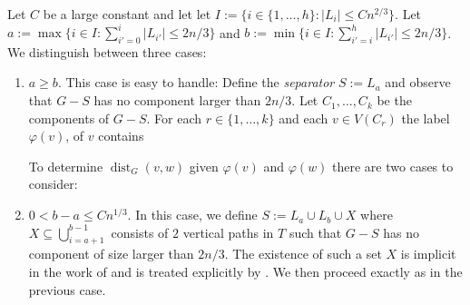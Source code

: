 \documentclass{patmorin}
\DeclareMathOperator{\dist}{dist}
\begin{document}
Let $C$ be a large constant and let let $I:=\{i\in\{1,\ldots,h\}: |L_i|\le Cn^{2/3}\}$.
Let $a:=\max\{i\in I: \sum_{i'=0}^i |L_{i'}| \le 2n/3\}$ and $b:=\min\{i\in I: \sum_{i'=i}^h |L_{i'}| \le 2n/3\}$.  We distinguish between three cases:
\begin{enumerate}
    \item $a \ge b$.  This case is easy to handle: Define the \emph{separator} $S:=L_{a}$ and observe that $G-S$ has no component larger than $2n/3$. Let $C_1,\ldots,C_k$ be the components of $G-S$.  For each $r\in\{1,\ldots,k\}$ and each $v\in V(C_r)$ the label $\varphi(v)$, of $v$ contains
    To determine $\dist_G(v,w)$ given $\varphi(v)$ and $\varphi(w)$ there are two cases to consider:

    \item $0 < b-a \le Cn^{1/3}$.  In this case, we define $S:=L_a\cup L_b\cup X$ where $X\subseteq \bigcup_{i=a+1}^{b-1}$ consists of $2$ vertical paths in $T$ such that $G-S$ has no component of size larger than $2n/3$.  The existence of such a set $X$ is implicit in the work of \citet{lipton.tarjan:applications} and is treated explicitly by \citet{dujmovic:graph}.  We then proceed exactly as in the previous case.


\end{enumerate}
\end{document}
